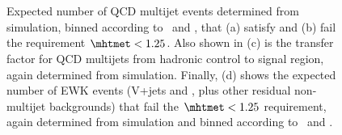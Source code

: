 \begin{figure}[!h]
  \centering
   ~
   \\
   ~ 
   \\
  \caption{Expected number of QCD multijet events determined from
    simulation, binned according to \njet~and \scalht, that (a) satisfy
    and (b) fail the requirement $\mhtmet < 1.25$. Also shown in (c)
    is the transfer factor for QCD multijets from hadronic control to signal region, 
    again determined from simulation. Finally, (d) shows the expected number of EWK events
    (V+jets and \ttbar, plus other residual non-multijet backgrounds)
    that fail the $\mhtmet < 1.25$ requirement, again determined from
    simulation and binned according to \njet~and \scalht.}
  \label{fig:qcd_plots}
\end{figure}

